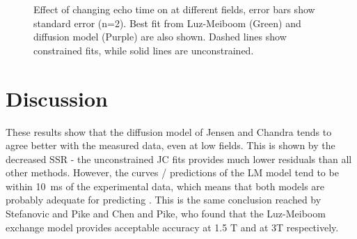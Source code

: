 \begin{figure}[h!t]

  \caption[Luz-Meiboom and diffusion model fits at different fields]{Effect of changing echo time on \Ttwo at different fields, error bars show standard error (n=2). Best fit from Luz-Meiboom (Green) and diffusion model (Purple) are also shown. Dashed lines show constrained fits, while solid lines are unconstrained.}
  \label{fig:dm-fitResults}
\end{figure}

\section{Discussion}
These results show that the diffusion model of Jensen and Chandra tends to agree better with the measured data, even at low fields.
This is shown by the decreased SSR - the unconstrained JC fits provides much lower residuals than all other methods.
However, the curves / predictions of the LM model tend to be within \SI{10}{ms} of the experimental data, which means that both models are probably adequate for predicting \Ttwo.
This is the same conclusion reached by Stefanovic and Pike and Chen and Pike, who found that the Luz-Meiboom exchange model provides acceptable accuracy at 1.5 T and at 3T respectively.

